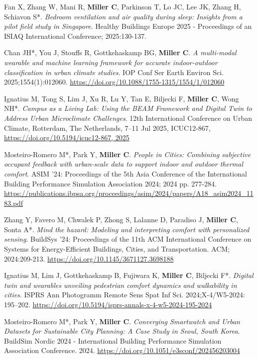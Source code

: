 \documentclass[10pt,a4paper]{article}
\begin{document}
\begin{small}
\begin{etaremune}
\item 
Fan X, Zhang W, Mani R, \textbf{Miller C}, Parkinson T, Lo JC, Lee JK, Zhang H, Schiavon S*. \emph{Bedroom ventilation and air quality during sleep: Insights from a pilot field study in Singapore}. Healthy Buildings Europe 2025 - Proceedings of an ISIAQ International Conference; 2025:130-137.
\item 
Chan JH*, You J, Stouffs R, Gottkehaskamp BG, \textbf{Miller C}. \emph{A multi-modal wearable and machine learning framework for accurate indoor-outdoor classification in urban climate studies}. IOP Conf Ser Earth Environ Sci. 2025;1554(1):012060. \url{https://doi.org/10.1088/1755-1315/1554/1/012060}
\item 
Ignatius M, Tong S, Lim J, Xu R, Lu Y, Tan E, Biljecki F, \textbf{Miller C}, Wong NH*. \emph{Campus as a Living Lab: Using the BEAM Framework and Digital Twin to Address Urban Microclimate Challenges}. 12th International Conference on Urban Climate, Rotterdam, The Netherlands, 7–11 Jul 2025, ICUC12-867, \url{https://doi.org/10.5194/icuc12-867, 2025}
\item 
Mosteiro-Romero M*, Park Y, \textbf{Miller C}. \emph{People in Cities: Combining subjective occupant feedback with urban-scale data to support indoor and outdoor thermal comfort}. ASIM '24: Proceedings of the 5th Asia Conference of the International Building Performance Simulation Association 2024; 2024 pp. 277-284. \url{https://publications.ibpsa.org/proceedings/asim/2024/papers/A18_asim2024_1183.pdf}
\item
Zhang Y, Favero M, Chwalek P, Zhong S, Lalanne D, Paradiso J, \textbf{Miller C}, Sonta A*. \emph{Mind the hazard: Modeling and interpreting comfort with personalized sensing}. BuildSys '24: Proceedings of the 11th ACM International Conference on Systems for Energy-Efficient Buildings, Cities, and Transportation. ACM; 2024:209-213. \url{https://doi.org/10.1145/3671127.3698188}
\item
Ignatius M, Lim J, Gottkehaskamp B, Fujiwara K, \textbf{Miller C}, Biljecki F*.  \emph{Digital twin and wearables unveiling pedestrian comfort dynamics and walkability in cities}. ISPRS Ann Photogramm Remote Sens Spat Inf Sci. 2024;X-4/W5-2024: 195–202. \url{https://doi.org/10.5194/isprs-annals-x-4-w5-2024-195-2024}
\item
Mosteiro-Romero M*, Park Y, \textbf{Miller C}.  \emph{Converging Smartwatch and Urban Datasets for Sustainable City Planning: A Case Study in Seoul, South Korea}. BuildSim Nordic 2024 - International Building Performance Simulation Association Conference. 2024. \url{https://doi.org/10.1051/e3sconf/202456203004}

\end{etaremune}
\end{small}
\end{document}
